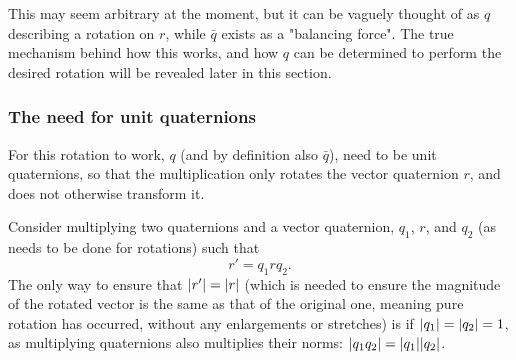 \documentclass[11pt]{article}
\begin{document}
This may seem arbitrary at the moment, but it can be vaguely thought of as $q$ describing a rotation on $r$, while $\bar{q}$ exists as a "balancing force". The true mechanism behind how this works, and how $q$ can be determined to perform the desired rotation will be revealed later in this section.

\subsubsection{The need for unit quaternions}

For this rotation to work, $q$ (and by definition also $\bar{q}$), need to be unit quaternions, so that the multiplication only rotates the vector quaternion $r$, and does not otherwise transform it.

Consider multiplying two quaternions and a vector quaternion, $q_1$, $r$, and $q_2$ (as needs to be done for rotations) such that
\begin{equation}
    r' = q_1rq_2.
\end{equation}
The only way to ensure that $\abs{r'} = \abs{r}$ (which is needed to ensure the magnitude of the rotated vector is the same as that of the original one, meaning pure rotation has occurred, without any enlargements or stretches) is if $\abs{q_1} = \abs{q_2} = 1$, as multiplying quaternions also multiplies their norms: $\abs{q_1q_2} = \abs{q_1}\abs{q_2}$. \cite{Math431}
\end{document}
